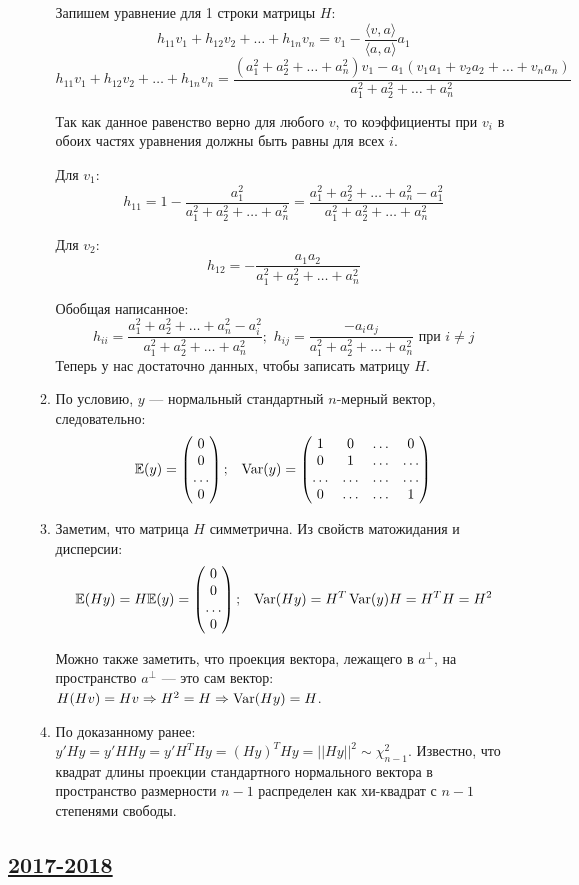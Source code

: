 \begin{enumerate}
\begin{enumerate}
	Запишем уравнение для 1 строки матрицы $H$:
	\[
	h_{11} v_1 + h_{12} v_2 + \ldots + h_{1n} v_n = v_1 - \frac{\langle v,a \rangle}{\langle a,a \rangle} a_1
	\]
	\[
	h_{11} v_1 + h_{12} v_2 + \ldots + h_{1n} v_n = \frac{(a_1^2 + a_2^2 + \ldots + a_n^2)v_1 - a_1(v_1 a_1 + v_2 a_2 + \ldots + v_n a_n)}{a_1^2 + a_2^2 + \ldots + a_n^2}
	\]
	
	Так как данное равенство верно для любого $v$, то коэффициенты при $v_i$ в обоих частях уравнения должны быть равны для всех $i$.
	
	Для $v_1$: 
	\[
		h_{11} = 1 - \frac{a_1^2}{a_1^2 + a_2^2 + \ldots + a_n^2} = \frac{a_1^2 + a_2^2 + \ldots + a_n^2 - a_1^2}{a_1^2 + a_2^2 + \ldots + a_n^2}
	\]
	
	Для $v_2$: 
	\[
		h_{12} = -\frac{a_1a_2}{a_1^2 + a_2^2 + \ldots + a_n^2}
	\]
	
	Обобщая написанное: 
	\[
	h_{ii} = \frac{a_1^2 + a_2^2 + \ldots + a_n^2 - a_i^2}{a_1^2 + a_2^2 + \ldots + a_n^2}; \,\, h_{ij} = \frac{-a_ia_j}{a_1^2 + a_2^2 + \ldots + a_n^2} \text{ при } i \ne j
	\]
	Теперь у нас достаточно данных, чтобы записать матрицу $H$.

	\item
	По условию, $y$ — нормальный стандартный $n$-мерный вектор, следовательно:
	\[
	\operatorname{\mathbb{E}}(y) =
	\begin{pmatrix}
	0 \\ 0 \\ \ldots \\ 0
	\end{pmatrix};
	\,\,\,\,\,
	\operatorname{Var}(y) =
	\begin{pmatrix}
	1 & 0 & \ldots & 0 \\
	0 & 1 & \ldots & \ldots \\
	\ldots & \ldots & \ldots & \ldots \\
	0 & \ldots & \ldots & 1 \\
	\end{pmatrix}
	\]
	\item
	Заметим, что матрица $H$ симметрична. Из свойств матожидания и дисперсии:
	\[
	\operatorname{\mathbb{E}}(Hy) = H \mathbb{E}(y) =
	\begin{pmatrix}
	0 \\ 0 \\ \ldots \\ 0
	\end{pmatrix};
	\,\,\,\,\,
	\operatorname{Var}(Hy) = H^T \operatorname{Var}(y) H = H^T H = H^2
	\]
	
	Можно также заметить, что проекция вектора, лежащего в $a^{\perp}$, на пространство $a^{\perp}$ — это сам вектор: $H(Hv) = Hv \Rightarrow H^2 = H \Rightarrow \operatorname{Var}(Hy) = H$.
	\item
	По доказанному ранее: $y'Hy = y'HHy = y'H^THy = (Hy)^THy = ||Hy||^2 \sim \chi^2_{n-1}$. 
	Известно, что квадрат длины проекции стандартного нормального вектора в пространство размерности $n-1$ распределен как хи-квадрат с $n-1$ степенями свободы.
\end{enumerate}
\end{enumerate}

\subsection[2017-2018]{\hyperref[sec:kr_04_ip_2017_2018]{2017-2018}}
\label{sec:sol_kr_04_ip_2017_2018}